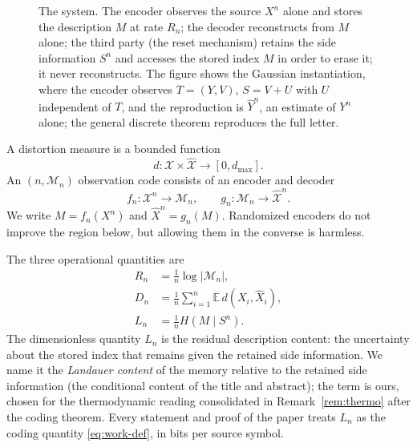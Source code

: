 ﻿\documentclass[11pt,onecolumn]{IEEEtran}
\newcommand{\E}{\mathbb{E}}
\newcommand{\cX}{\mathcal{X}}
\newcommand{\hX}{\widehat{X}}
\newcommand{\hXn}{\widehat{X}^{n}}
\newcommand{\hY}{\widehat{Y}}
\begin{document}
\begin{figure}[!t]
\centering
{}
\caption{The system. The encoder observes the source $X^n$ alone and stores
the description $M$ at rate $R_n$; the decoder reconstructs from $M$ alone;
the third party (the reset mechanism) retains the side information
$S^n$ and accesses the stored index $M$ in order to erase it; it never
reconstructs. The figure shows the Gaussian
instantiation, where the encoder observes $T=(Y,V)$, $S=V+U$ with $U$
independent of $T$, and
the reproduction is $\hY^n$, an estimate of $Y^n$ alone; the general
discrete theorem reproduces the full letter.}
\label{fig:system}
\end{figure}

A distortion measure is a bounded function
\begin{equation}
 d:\cX\times\widehat{\cX}\longrightarrow[0,d_{\max}].
\end{equation}
An $(n,\mathcal M_n)$ observation code consists of an encoder and decoder
\begin{equation}
 f_n:\cX^n\to\mathcal M_n,
 \qquad
 g_n:\mathcal M_n\to\widehat{\cX}^{n}.
\end{equation}
We write $M=f_n(X^n)$ and $\hXn=g_n(M)$. Randomized encoders do not improve
the region below, but allowing them in the converse is harmless.

The three operational quantities are
\begin{align}
 R_n&=\frac{1}{n}\log |\mathcal M_n|,\label{eq:rate-def}\\
 D_n&=\frac{1}{n}\sum_{i=1}^{n}\E\,d(X_i,\hX_i),\label{eq:dist-def}\\
 L_n&=\frac{1}{n}H(M\mid S^n).\label{eq:work-def}
\end{align}
The dimensionless quantity $L_n$ is the residual description content: the
uncertainty about the stored index that remains given the retained side
information. We name it the \emph{Landauer content} of the memory relative
to the retained side information (the conditional content of the
title and abstract); the term is ours, chosen for the
thermodynamic reading consolidated in Remark~\ref{rem:thermo} after the
coding theorem. Every statement and proof of the paper treats $L_n$ as
the coding quantity \eqref{eq:work-def}, in bits per source symbol.
\end{document}
